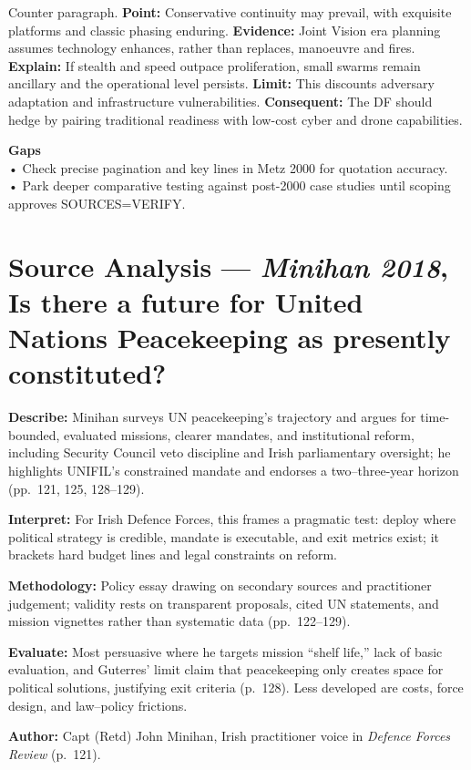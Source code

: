 Counter paragraph.  
\textbf{Point:} Conservative continuity may prevail, with exquisite platforms and classic phasing enduring.  
\textbf{Evidence:} Joint Vision era planning assumes technology enhances, rather than replaces, manoeuvre and fires.  
\textbf{Explain:} If stealth and speed outpace proliferation, small swarms remain ancillary and the operational level persists.  
\textbf{Limit:} This discounts adversary adaptation and infrastructure vulnerabilities.  
\textbf{Consequent:} The DF should hedge by pairing traditional readiness with low-cost cyber and drone capabilities.  

\textbf{Gaps}\\  
• Check precise pagination and key lines in Metz 2000 for quotation accuracy.\\  
• Park deeper comparative testing against post-2000 case studies until scoping approves SOURCES=VERIFY.  

\parencite{MINIHAN_2018}

\section*{Source Analysis — \textit{Minihan 2018}, Is there a future for United Nations Peacekeeping as presently constituted?}  
\textbf{Describe:} Minihan surveys UN peacekeeping’s trajectory and argues for time-bounded, evaluated missions, clearer mandates, and institutional reform, including Security Council veto discipline and Irish parliamentary oversight; he highlights UNIFIL’s constrained mandate and endorses a two–three-year horizon (pp.~121, 125, 128–129).  

\textbf{Interpret:} For Irish Defence Forces, this frames a pragmatic test: deploy where political strategy is credible, mandate is executable, and exit metrics exist; it brackets hard budget lines and legal constraints on reform.  

\textbf{Methodology:} Policy essay drawing on secondary sources and practitioner judgement; validity rests on transparent proposals, cited UN statements, and mission vignettes rather than systematic data (pp.~122–129).  

\textbf{Evaluate:} Most persuasive where he targets mission “shelf life,” lack of basic evaluation, and Guterres’ limit claim that peacekeeping only creates space for political solutions, justifying exit criteria (p.~128). Less developed are costs, force design, and law–policy frictions.  

\textbf{Author:} Capt (Retd) John Minihan, Irish practitioner voice in \textit{Defence Forces Review} (p.~121).  

